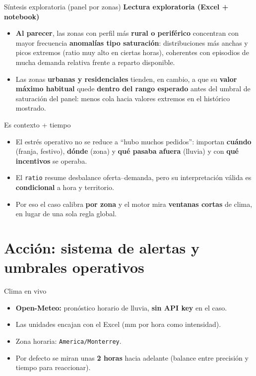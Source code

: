 \documentclass[aspectratio=169,spanish]{beamer}
\begin{document}
\begin{frame}{Síntesis exploratoria (panel por zonas)}
  \small
  \textbf{Lectura exploratoria (Excel + notebook)}\\[0.6em]
  \begin{itemize}
    \item \textbf{Al parecer}, las zonas con perfil más \textbf{rural o periférico} concentran con mayor frecuencia \textbf{anomalías tipo saturación}: distribuciones más anchas y picos extremos (ratio muy alto en ciertas horas), coherentes con episodios de mucha demanda relativa frente a reparto disponible.
    \item Las zonas \textbf{urbanas y residenciales} tienden, en cambio, a que su \textbf{valor máximo habitual} quede \textbf{dentro del rango esperado} antes del umbral de saturación del panel: menos cola hacia valores extremos en el histórico mostrado.
  \end{itemize}
\end{frame}

\begin{frame}{Es contexto + tiempo}
  \begin{itemize}
    \item El estrés operativo no se reduce a ``hubo muchos pedidos'': importan \textbf{cuándo} (franja, festivo), \textbf{dónde} (zona) y \textbf{qué pasaba afuera} (lluvia) y con \textbf{qué incentivos} se operaba.
    \item El \texttt{ratio} resume desbalance oferta--demanda, pero su interpretación válida es \textbf{condicional} a hora y territorio.
    \item Por eso el caso calibra \textbf{por zona} y el motor mira \textbf{ventanas cortas} de clima, en lugar de una sola regla global.
  \end{itemize}
\end{frame}

\section{Acción: sistema de alertas y umbrales operativos}

\begin{frame}{Clima en vivo}
  \begin{itemize}
    \item \textbf{Open-Meteo:} pronóstico horario de lluvia, \textbf{sin API key} en el caso.
    \item Las unidades encajan con el Excel (mm por hora como intensidad).
    \item Zona horaria: \texttt{America/Monterrey}.
    \item Por defecto se miran unas \textbf{2 horas} hacia adelante (balance entre precisión y tiempo para reaccionar).
  \end{itemize}
\end{frame}
\end{document}
